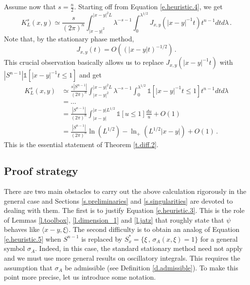 \documentclass[10pt,twoside]{article}
\newcommand{\one}{\mathds{1}}
\numberwithin{theorem}{section}
\begin{document}
Assume now that $s=\frac{n}{2}$. Starting off from Equation \eqref{e.heuristic.4}, we get
\[
K_L^s(x,y)\simeq \frac{s}{(2\pi)^n}\int_{|x-y|^2}^{|x-y|^2L}\lambda^{-s-1}\int_0^{\lambda^{1/2}}J_{x,y}(|x-y|^{-1}t) t^{n-1}dt d\lambda\, .
\]
Note that, by the stationary phase method,
\begin{equation}\label{e.heuristic.5}
J_{x,y}(t) = O\left((|x-y|t)^{-1/2}\right)\, .
\end{equation}
This crucial observation basically allows us to replace $J_{x,y}(|x-y|^{-1}t)$ with $|S^{n-1}|\one[|x-y|^{-1}t\leq 1]$ and get
\begin{align*}
K_L^s(x,y)&\simeq \frac{s|S^{n-1}|}{(2\pi)^n}\int_{|x-y|^2}^{|x-y|^2L}\lambda^{-s-1}\int_0^{\lambda^{1/2}}\one[|x-y|^{-1}t\leq 1] t^{n-1}dtd\lambda\\
& = \dots\\
& = \frac{|S^{n-1}|}{(2\pi)^n}\int_{|x-y|}^{|x-y|L^{1/2}}\one[u\leq 1]\frac{du}{u}+O(1)\\
& = \frac{|S^{n-1}|}{(2\pi)^n}\ln\left(L^{1/2}\right)-\ln_+\left(L^{1/2}|x-y|\right) + O(1)\, .
\end{align*}
This is the essential statement of Theorem \ref{t.diff.2}.

\subsection{Proof strategy}\label{ss.outline}

There are two main obstacles to carry out the above calculation rigorously in the general case and Sections \ref{s.preliminaries} and \ref{s.singularities} are devoted to dealing with them. The first is to justify Equation \eqref{e.heuristic.3}. This is the role of Lemmas \ref{l.toolbox}, \ref{l.dimension_1} and \ref{l.jatz} that roughly state that $\psi$ behaves like $\langle x-y,\xi\rangle$. The second difficulty is to obtain an analog of Equation \eqref{e.heuristic.5} when $S^{n-1}$ is replaced by $S^*_x=\{\xi\, ,\, \sigma_A(x,\xi)=1\}$ for a general symbol $\sigma_A$. Indeed, in this case, the standard stationary method need not apply and we must use more general results on oscillatory integrals. This requires the assumption that $\sigma_A$ be admissible (see Definition \ref{d.admissible}). To make this point more precise, let us introduce some notation.\\
\end{document}
